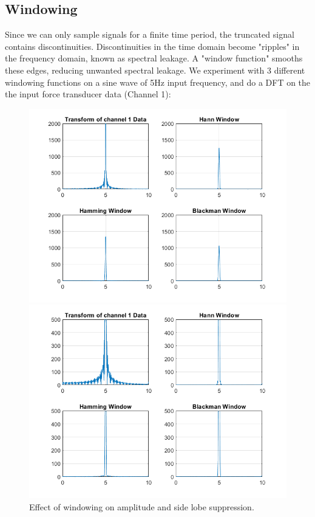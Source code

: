 \documentclass[8pt]{extarticle}
\begin{document}
\subsection{Windowing}

Since we can only sample signals for a finite time period, the truncated signal contains discontinuities. Discontinuities in the time domain become "ripples" in the frequency domain, known as spectral leakage. A "window function" smooths these edges, reducing unwanted spectral leakage. We experiment with 3 different windowing functions on a sine wave of 5Hz input frequency, and do a DFT on the the input force transducer data (Channel 1):

\begin{figure}[h]
\centering
\begin{minipage}{0.5\textwidth}
  \centering
  \includegraphics[width=0.7\linewidth]{figures/sin5_window.png}
\end{minipage}%
\hfill
\begin{minipage}{0.5\textwidth}
  \centering
  \includegraphics[width=0.7\linewidth]{figures/sin5_window_zoomed.png}
\end{minipage}
\caption{Effect of windowing on amplitude and side lobe suppression.}
\label{fig:windowing}
\end{figure}
\end{document}
